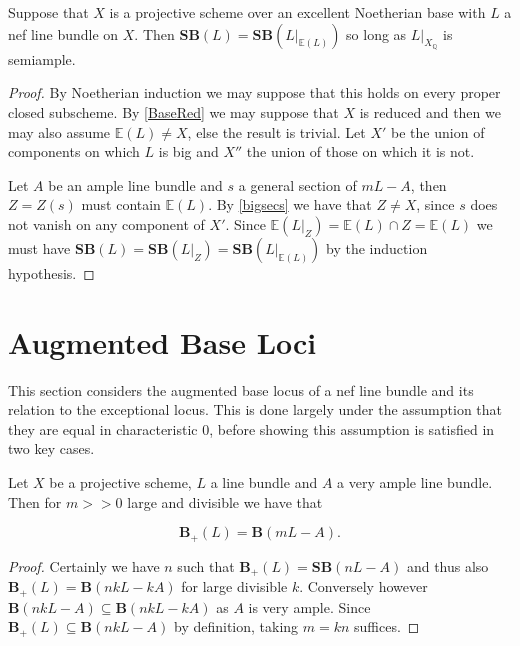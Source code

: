 \documentclass[a4paper,12pt]{book}
\newcommand{\SB}{\mathbf{SB}}
\newcommand{\BB}{\mathbf{B}}
\newcommand{\BS}{\mathbf{B}_{+}}
\newcommand\myworries[1]{\textcolor{red}{#1}}
\begin{document}
\begin{corollary}\label{Main_Loci2}
	Suppose that $X$ is a projective scheme over an excellent Noetherian base with $L$ a nef line bundle on $X$. Then $\SB(L)=\SB(L|_{\mathbb{E}(L)})$ so long as $L|_{X_{\mathbb{Q}}}$ is semiample.
\end{corollary}
\begin{proof}
	By Noetherian induction we may suppose that this holds on every proper closed subscheme. By \autoref{BaseRed} we may suppose that $X$ is reduced and then we may also assume $\mathbb{E}(L) \neq X$, else the result is trivial. Let $X'$ be the union of components on which $L$ is big and $X''$ the union of those on which it is not.
	
	Let $A$ be an ample line bundle and $s$ a general section of $mL-A$, then $Z=Z(s)$ must contain $\mathbb{E}(L)$. By \autoref{bigsecs} we have that $Z \neq X$, since $s$ does not vanish on any component of $X'$. Since $\mathbb{E}(L|_{Z}) = \mathbb{E}(L)\cap Z= \mathbb{E}(L)$ we must have $\SB(L)=\SB(L|_{Z})=\SB(L|_{\mathbb{E}(L)})$ by the induction hypothesis. 
\end{proof}



\section{Augmented Base Loci}

This section considers the augmented base locus of a nef line bundle and its relation to the exceptional locus. This is done largely under the assumption that they are equal in characteristic $0$, before showing this assumption is satisfied in two key cases.


\begin{lemma}\label{amp}
	Let $X$ be a projective scheme, $L$ a line bundle and $A$ a very ample line bundle. Then for $m>>0$ large and divisible we have that 
	
	$$\BS(L)=\BB(mL-A).$$
\end{lemma}

\begin{proof}
	Certainly we have $n$ such that $\BS(L)=\SB(nL-A)$ and thus also $\BS(L)=\BB(nkL-kA)$ for large divisible $k$. Conversely however $\BB(nkL-A)\subseteq \BB(nkL-kA)$ as $A$ is very ample. Since $\BS(L)\subseteq \BB(nkL-A)$ by definition, taking $m=kn$ suffices.
\end{proof}
\end{document}
